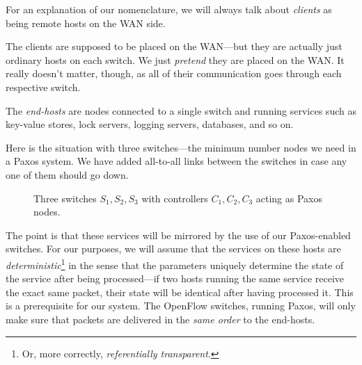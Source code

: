For an explanation of our nomenclature, we will always talk about
\textit{clients} as being remote hosts on the \ac{WAN} side.

The clients are supposed to be placed on the \ac{WAN}---but they are actually
just ordinary hosts on each switch.  We just \textit{pretend} they are
placed on the WAN.  It really doesn't matter, though, as all of their
communication goes through each respective switch.

The \textit{end-hosts} are nodes connected to a single switch and running
services such as key-value stores, lock servers, logging servers,
databases, and so on.

Here is the situation with three switches---the minimum number nodes we need
in a Paxos system.  We have added all-to-all links between the switches in
case any one of them should go down.

\begin{figure}[H]
  \centering
  \caption{Three switches $S_1, S_2, S_3$ with controllers $C_1, C_2, C_3$ acting as Paxos nodes.}
  \label{figure:graph.three.switches}
\end{figure}

The point is that these services will be mirrored by the use of our
Paxos-enabled switches.  For our purposes, we will assume that the services
on these hosts are \textit{deterministic}\footnote{Or, more correctly,
\textit{referentially transparent}.} in the sense that the parameters
uniquely determine the state of the service after being processed---if two
hosts running the same service receive the exact same packet, their state
will be identical after having processed it.  This is a prerequisite for our
system.  The OpenFlow switches, running Paxos, will only make sure that
packets are delivered in the \textit{same order} to the end-hosts.

